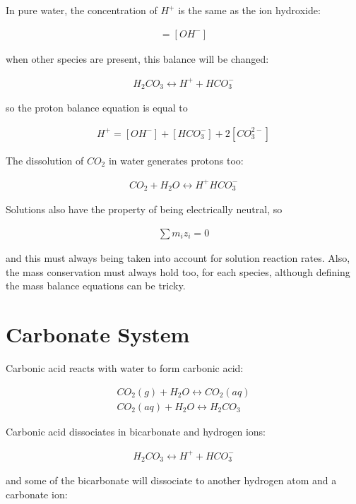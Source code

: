 \documentclass[11pt,twoside]{report}
\begin{document}
In pure water, the concentration of $H^{+}$ is the same as the ion hydroxide:

\begin{align}
   [H^{+}] = [OH^{-}]
\end{align}

when other species are present, this balance will be changed:

\begin{align}
   H_{2}CO_{3} \longleftrightarrow H^{+} + HCO_{3}^{-}
\end{align}

so the proton balance equation is equal to 

\begin{align}
   H^{+} = [OH^{-}] + [HCO_{3}^{-}] + 2[CO_{3}^{2-}]
\end{align}

The dissolution of $CO_{2}$ in water generates protons too:

\begin{align}
   CO_{2} + H_{2}O \longleftrightarrow H^{+} HCO_{3}^{-}
\end{align}

Solutions also have the property of being electrically neutral, so 

\begin{align}
   \sum m_{i}z_{i} = 0
\end{align}

and this must always being taken into account for solution reaction rates. Also, the mass conservation must always hold too, for each species, although defining the mass balance equations can be tricky. 

\section{Carbonate System}
Carbonic acid reacts with water to form carbonic acid:

\begin{align}
   CO_{2}(g) + H_{2}O \longleftrightarrow  CO_{2}(aq)\\
   CO_{2}(aq) + H_{2}O\longleftrightarrow H_{2}CO_{3}
\end{align}

Carbonic acid dissociates in bicarbonate and hydrogen ions: 

\begin{align}
   H_{2}CO_{3} \longleftrightarrow H^{+} + HCO_{3}^{-}
\end{align}

and some of the bicarbonate will dissociate to another hydrogen atom and a carbonate ion:
\end{document}

